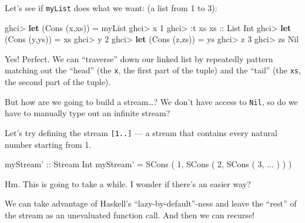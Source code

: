 \documentclass[]{article}
\newenvironment{Shaded}{}{}
\newcommand{\KeywordTok}[1]{\textcolor[rgb]{0.00,0.44,0.13}{\textbf{{#1}}}}
\newcommand{\DataTypeTok}[1]{\textcolor[rgb]{0.56,0.13,0.00}{{#1}}}
\newcommand{\DecValTok}[1]{\textcolor[rgb]{0.25,0.63,0.44}{{#1}}}
\newcommand{\OtherTok}[1]{\textcolor[rgb]{0.00,0.44,0.13}{{#1}}}
\newcommand{\FunctionTok}[1]{\textcolor[rgb]{0.02,0.16,0.49}{{#1}}}
\newcommand{\NormalTok}[1]{{#1}}
\begin{document}
Let's see if \texttt{myList} does what we want: (a list from 1 to 3):

\begin{Shaded}
\begin{Highlighting}[]
\NormalTok{ghci}\FunctionTok{>} \KeywordTok{let} \NormalTok{(}\DataTypeTok{Cons} \NormalTok{(x,xs)) }\FunctionTok{=} \NormalTok{myList}
\NormalTok{ghci}\FunctionTok{>} \NormalTok{x}
\DecValTok{1}
\NormalTok{ghci}\FunctionTok{>} \FunctionTok{:}\NormalTok{t xs}
\OtherTok{xs ::} \DataTypeTok{List} \DataTypeTok{Int}
\NormalTok{ghci}\FunctionTok{>} \KeywordTok{let} \NormalTok{(}\DataTypeTok{Cons} \NormalTok{(y,ys)) }\FunctionTok{=} \NormalTok{xs}
\NormalTok{ghci}\FunctionTok{>} \NormalTok{y}
\DecValTok{2}
\NormalTok{ghci}\FunctionTok{>} \KeywordTok{let} \NormalTok{(}\DataTypeTok{Cons} \NormalTok{(z,zs)) }\FunctionTok{=} \NormalTok{ys}
\NormalTok{ghci}\FunctionTok{>} \NormalTok{z}
\DecValTok{3}
\NormalTok{ghci}\FunctionTok{>} \NormalTok{zs}
\DataTypeTok{Nil}
\end{Highlighting}
\end{Shaded}

Yes! Perfect. We can ``traverse'' down our linked list by repeatedly
pattern matching out the ``head'' (the \texttt{x}, the first part of the
tuple) and the ``tail'' (the \texttt{xs}, the second part of the tuple).

But how are we going to build a stream\ldots{}? We don't have access to
\texttt{Nil}, so do we have to manually type out an infinite stream?

Let's try defining the stream \texttt{{[}1..{]}} --- a stream that
contains every natural number starting from 1.

\begin{Shaded}
\begin{Highlighting}[]
\OtherTok{myStream' ::} \DataTypeTok{Stream} \DataTypeTok{Int}
\NormalTok{myStream' }\FunctionTok{=} \DataTypeTok{SCons} \NormalTok{( }\DecValTok{1}\NormalTok{, }\DataTypeTok{SCons} \NormalTok{( }\DecValTok{2}\NormalTok{, }\DataTypeTok{SCons} \NormalTok{( }\DecValTok{3}\NormalTok{, }\FunctionTok{...} \NormalTok{) ) )}
\end{Highlighting}
\end{Shaded}

Hm. This is going to take a while. I wonder if there's an easier way?

We can take advantage of Haskell's ``lazy-by-default''-ness and leave
the ``rest'' of the stream as an unevaluated function call. And then we
can recurse!
\end{document}
